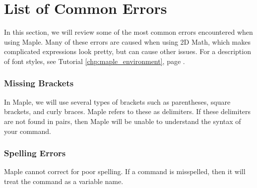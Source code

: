 \chapter{List of Common Errors}
\label{chp:list_of_common_errors}

In this section, we will review some of the most common errors encountered when using Maple. Many of these errors are caused when using 2D Math, which makes complicated expressions look pretty, but can cause other issues. For a description of font styles, see Tutorial \ref{chp:maple_environment}, page \pageref{chp:maple_environment}.

\subsection{Missing Brackets}

In Maple, we will use several types of brackets such as parentheses, square brackets, and curly braces. Maple refers to these as delimiters. If these delimiters are not found in pairs, then Maple will be unable to understand the syntax of your command.

\begin{maplegroup}
\begin{mapleinput}
\mapleinline{active}{1d}{plot([f(x), g(x), x =-5..5);}{}
\end{mapleinput}
\mapleresult
\begin{maplelatex}
\end{maplelatex}
\end{maplegroup}

\subsection{Spelling Errors}

Maple cannot correct for poor spelling. If a command is misspelled, then it will treat the command as a variable name.

\begin{maplegroup}
\begin{mapleinput}
\end{mapleinput}
\mapleresult
\begin{maplelatex}
\end{maplelatex}
\end{maplegroup}


